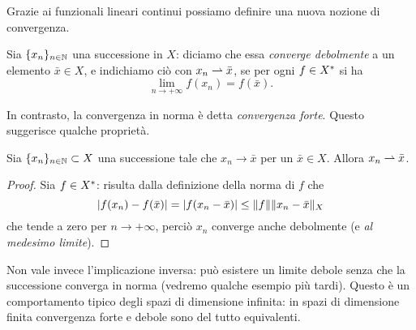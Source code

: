 Grazie ai funzionali lineari continui possiamo definire una nuova nozione di convergenza.
\begin{definizione} \label{d:convergenza-debole}
    Sia $\{x_n\}_{n\in\mathbb{N}}$ una successione in $X$: diciamo che essa \emph{converge debolmente} a un elemento $\bar{x}\in X$, e indichiamo ciò con $x_n\rightharpoonup\bar{x}$, se per ogni $f\in X^{\ast}$ si ha
    \begin{equation}
        \lim_{n\to+\infty}f(x_n)=f(\bar{x}).
        \label{eq:convergenza-debole}
    \end{equation}
\end{definizione}
In contrasto, la convergenza in norma è detta \emph{convergenza forte}.
Questo suggerisce qualche proprietà.
\begin{proprieta} \label{pr:convergenza-forte-implica-debole}
    Sia $\{x_n\}_{n\in\mathbb{N}}\subset X$ una successione tale che $x_n\to\bar{x}$ per un $\bar{x}\in X$.
    Allora $x_n\rightharpoonup\bar{x}$.
\end{proprieta}
\begin{proof}
    Sia $f\in X^{\ast}$: risulta dalla definizione della norma di $f$ che
    \begin{equation}
        \lvert f(x_n)-f(\bar{x})\rvert=
        \lvert f(x_n-\bar{x})\rvert\le
        \lVert f\rVert\lVert x_n-\bar{x}\rVert_X
    \end{equation}
    che tende a zero per $n\to+\infty$, perciò $x_n$ converge anche debolmente (e \emph{al medesimo limite}).
\end{proof}
Non vale invece l'implicazione inversa: può esistere un limite debole senza che la successione converga in norma (vedremo qualche esempio più tardi).
Questo è un comportamento tipico degli spazi di dimensione infinita: in spazi di dimensione finita convergenza forte e debole sono del tutto equivalenti.

